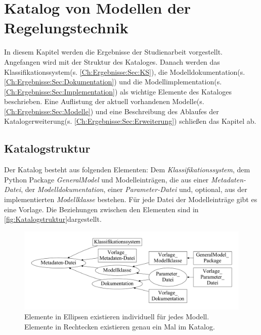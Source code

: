 \chapter{Katalog von Modellen der Regelungstechnik}
\label{Ch:Ergebnisse}
In diesem Kapitel werden die Ergebnisse der Studienarbeit vorgestellt. Angefangen wird mit der Struktur des Kataloges. Danach werden das Klassifikationssystem(s. \ref{Ch:Ergebnisse:Sec:KS}), die Modelldokumentation(s. \ref{Ch:Ergebnisse:Sec:Dokumentation}) und die Modellimplementation(s. \ref{Ch:Ergebnisse:Sec:Implementation}) als wichtige Elemente des Kataloges beschrieben. Eine Auflistung der aktuell vorhandenen Modelle(s. \ref{Ch:Ergebnisse:Sec:Modelle}) und eine Beschreibung des Ablaufes der Katalogerweiterung(s. \ref{Ch:Ergebnisse:Sec:Erweiterung}) schließen das Kapitel ab.
\section{Katalogstruktur}
\label{Ch:Ergebnisse:Sec:Struktur}
Der Katalog besteht aus folgenden Elementen: Dem \textit{Klassifikationssystem}, dem Python Package \textit{GeneralModel} und Modelleinträgen, die aus einer \textit{Metadaten-Datei}, der \textit{Modelldokumentation}, einer \textit{Parameter-Datei} und, optional, aus der implementierten \textit{Modellklasse} bestehen. Für jede Datei der Modelleinträge gibt es eine Vorlage. Die Beziehungen zwischen den Elementen sind in \autoref{fig:Katalogstruktur}dargestellt.

\begin{figure}[H]
	\centering
	\includegraphics[width=1\linewidth]{Katalogstruktur}
	\caption[Katalogstruktur]{Elemente in Ellipsen existieren individuell für jedes Modell. Elemente in Rechtecken existieren genau ein Mal im Katalog.}
	\label{fig:Katalogstruktur}
\end{figure}

